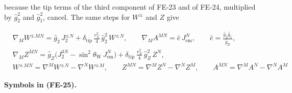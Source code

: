 \documentclass[
  10pt,
]{article}
\begin{document}
because the tip terms of the third component of FE-23 and of FE-24,
multiplied by \(\hat g_2^2\) and \(\hat g_1^2\), cancel. The same steps
for \(W^\pm\) and \(Z\) give

\[
\begin{aligned}
&\nabla_MW^{\pm}{}^{MN} = \hat g_2\,J_2^{\pm}{}^N + \delta_{\mathrm{tip}}\,\frac{v_\Sigma^2}{4}\,\hat
 g_2^2\,W^{\pm}{}^N,\qquad
 \nabla_MA^{MN} = \hat e\,J_{\mathrm{em}}^N,\qquad \hat e = \frac{\hat g_2\hat g_1}{\hat g_Z},\\
&\nabla_MZ^{MN} = \hat g_Z\big(J_2^{3N} - \sin^2\theta_{\mathrm{W}}\,J_{\mathrm{em}}^N\big)
 + \delta_{\mathrm{tip}}\,\frac{v_\Sigma^2}{4}\,\hat g_Z^2\,Z^N,\\
&W^{\pm}{}^{MN} = \nabla^MW^{\pm}{}^N - \nabla^NW^{\pm}{}^M,\qquad Z^{MN} = \nabla^MZ^N - \nabla^NZ^M,\qquad
 A^{MN} = \nabla^MA^N - \nabla^NA^M
\end{aligned} \tag{FE-25}
\]

\textbf{Symbols in (FE-25).}
\end{document}
